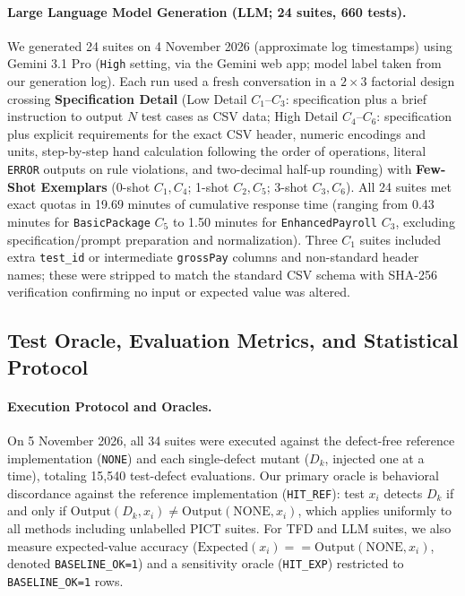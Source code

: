 \documentclass[acmsmall]{acmart}
\begin{document}
\paragraph{Large Language Model Generation (LLM; 24 suites, 660 tests).}
We generated 24 suites on 4 November 2026 (approximate log timestamps) using Gemini 3.1 Pro (\texttt{High} setting, via the Gemini web app; model label taken from our generation log). Each run used a fresh conversation in a $2 \times 3$ factorial design crossing \textbf{Specification Detail} (Low Detail $C_1$--$C_3$: specification plus a brief instruction to output $N$ test cases as CSV data; High Detail $C_4$--$C_6$: specification plus explicit requirements for the exact CSV header, numeric encodings and units, step-by-step hand calculation following the order of operations, literal \texttt{ERROR} outputs on rule violations, and two-decimal half-up rounding) with \textbf{Few-Shot Exemplars} (0-shot $C_1, C_4$; 1-shot $C_2, C_5$; 3-shot $C_3, C_6$). All 24 suites met exact quotas in 19.69 minutes of cumulative response time (ranging from 0.43 minutes for \texttt{BasicPackage} $C_5$ to 1.50 minutes for \texttt{EnhancedPayroll} $C_3$, excluding specification/prompt preparation and normalization). Three $C_1$ suites included extra \texttt{test\_id} or intermediate \texttt{grossPay} columns and non-standard header names; these were stripped to match the standard CSV schema with SHA-256 verification confirming no input or expected value was altered.

\subsection{Test Oracle, Evaluation Metrics, and Statistical Protocol}
\label{sec:oracle}

\paragraph{Execution Protocol and Oracles.}
On 5 November 2026, all 34 suites were executed against the defect-free reference implementation (\texttt{NONE}) and each single-defect mutant ($D_k$, injected one at a time), totaling 15,540 test-defect evaluations. Our primary oracle is behavioral discordance against the reference implementation (\texttt{HIT\_REF}): test $x_i$ detects $D_k$ if and only if $\text{Output}(D_k, x_i) \neq \text{Output}(\text{NONE}, x_i)$, which applies uniformly to all methods including unlabelled PICT suites. For TFD and LLM suites, we also measure expected-value accuracy ($\text{Expected}(x_i) == \text{Output}(\text{NONE}, x_i)$, denoted \texttt{BASELINE\_OK=1}) and a sensitivity oracle (\texttt{HIT\_EXP}) restricted to \texttt{BASELINE\_OK=1} rows.
\end{document}
